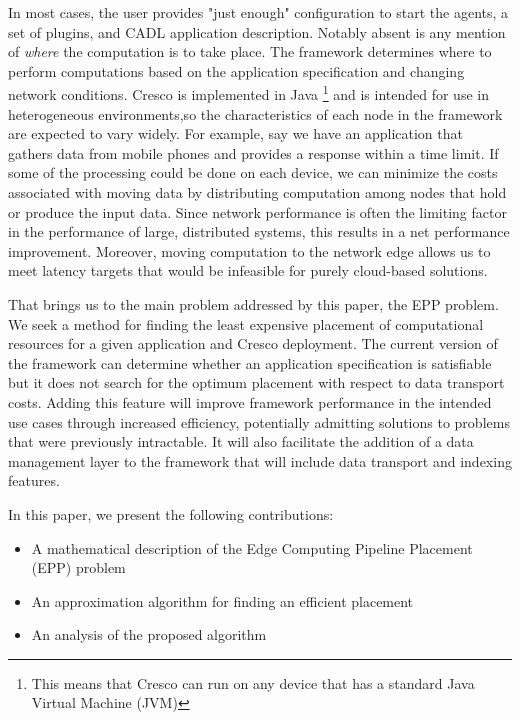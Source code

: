 \documentclass{article}
\begin{document}
    In most cases, the user provides "just enough" configuration to start the agents, a set of plugins, and CADL application description. Notably absent is any mention of \textit{where} the computation is to take place. The framework determines where to perform computations based on the application specification and changing network conditions. Cresco is implemented in Java \footnote{This means that Cresco can run on any device that has a standard Java Virtual Machine (JVM)}
    and is intended for use in heterogeneous environments,so the characteristics of each node in the framework are expected to vary widely. For example, say we have an application that gathers data from mobile phones and provides a response within a time limit. If some of the processing could be done on each device, we can minimize the costs associated with moving data by distributing computation among nodes that hold or produce the input data. Since network performance is often the limiting factor in the performance of large, distributed systems, this results in a net performance improvement. Moreover, moving computation to the network edge allows us to meet latency targets that would be infeasible for purely cloud-based solutions.
    
    That brings us to the main problem addressed by this paper, the EPP problem.  We seek a method for finding the least expensive placement of computational resources for a given application and Cresco deployment. The current version of the framework can determine whether an application specification is satisfiable but it does not search for the optimum placement with respect to data transport costs. Adding this feature will improve framework performance in the intended use cases through increased efficiency, potentially admitting solutions to problems that were previously intractable. It will also facilitate the addition of a data management layer to the framework that will include data transport and indexing features.
    
    In this paper, we present the following contributions:
    \begin{itemize}
    	\item A mathematical description of the Edge Computing Pipeline Placement (EPP) problem
    	\item An approximation algorithm for finding an efficient placement
 	    \item An analysis of the proposed algorithm
    \end{itemize}
    
\end{document}
